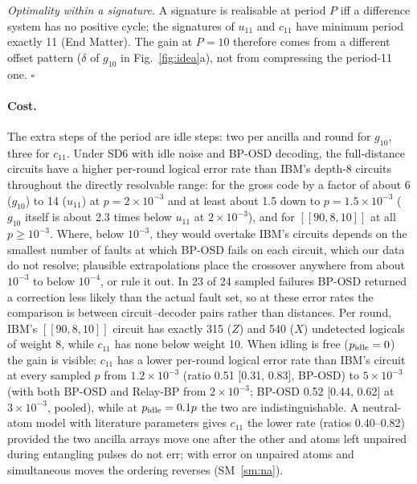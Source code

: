 \documentclass[aps,prl,twocolumn,superscriptaddress,nofootinbib]{revtex4-2}
\newcommand{\code}[1]{[[#1]]}
\begin{document}
\emph{Optimality within a signature.} A signature is realisable at period $P$ iff a
difference system has no positive cycle; the signatures of $u_{11}$ and $c_{11}$ have
minimum period exactly 11 (End Matter). The gain at $P=10$ therefore comes from a
different offset pattern ($\delta$ of $g_{10}$ in Fig.~\ref{fig:idea}a), not from compressing
the period-11 one. $\square$

\paragraph{Cost.}
The extra steps of the period are idle steps: two per ancilla and round for $g_{10}$, three
for $c_{11}$. Under SD6 with idle noise and BP-OSD decoding, the full-distance circuits have
a higher per-round logical error rate than IBM's depth-8 circuits throughout the directly
resolvable range: for the gross code by a factor of about 6 ($g_{10}$) to 14 ($u_{11}$) at $p=2\times10^{-3}$ and
at least about 1.5 down to $p=1.5\times10^{-3}$ ($g_{10}$ itself is about 2.3 times below
$u_{11}$ at $2\times10^{-3}$), and for $\code{90,8,10}$ at all $p\ge10^{-3}$. Where, below
$10^{-3}$, they would overtake IBM's circuits depends on the smallest number of faults at
which BP-OSD fails on each circuit, which our data do not resolve; plausible extrapolations
place the crossover anywhere from about $10^{-3}$ to below $10^{-4}$, or rule it out. In 23 of 24
sampled failures BP-OSD returned a correction less likely than the actual fault set, so at
these error rates the comparison is between circuit--decoder pairs rather than distances.
Per round, IBM's $\code{90,8,10}$ circuit has exactly 315 ($Z$) and 540 ($X$) undetected
logicals of weight 8, while $c_{11}$ has none below weight 10. When idling is free ($p_{\rm idle}=0$) the gain is visible:
$c_{11}$ has a lower per-round logical error rate than IBM's circuit at every sampled $p$
from $1.2\times10^{-3}$ (ratio 0.51 [0.31, 0.83], BP-OSD) to $5\times10^{-3}$ (with both
BP-OSD and Relay-BP from $2\times10^{-3}$; BP-OSD 0.52 [0.44, 0.62] at $3\times10^{-3}$, pooled), while at
$p_{\rm idle}=0.1p$ the two are indistinguishable. A neutral-atom model with
literature parameters gives $c_{11}$ the lower rate (ratios 0.40--0.82) provided the two
ancilla arrays move one after the other and atoms left unpaired during entangling pulses do
not err; with error on unpaired atoms and simultaneous moves the ordering reverses
(SM~\ref{sm:na}).
\end{document}
